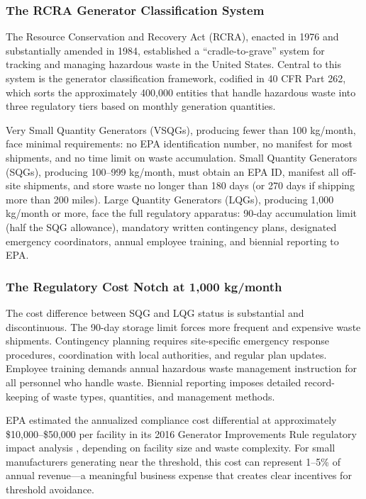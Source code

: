 \documentclass[12pt]{article}
\begin{document}
\subsubsection*{The RCRA Generator Classification System}
The Resource Conservation and Recovery Act (RCRA), enacted in 1976 and substantially amended in 1984, established a ``cradle-to-grave'' system for tracking and managing hazardous waste in the United States. Central to this system is the generator classification framework, codified in 40 CFR Part 262, which sorts the approximately 400,000 entities that handle hazardous waste into three regulatory tiers based on monthly generation quantities.

Very Small Quantity Generators (VSQGs), producing fewer than 100 kg/month, face minimal requirements: no EPA identification number, no manifest for most shipments, and no time limit on waste accumulation. Small Quantity Generators (SQGs), producing 100--999 kg/month, must obtain an EPA ID, manifest all off-site shipments, and store waste no longer than 180 days (or 270 days if shipping more than 200 miles). Large Quantity Generators (LQGs), producing 1,000 kg/month or more, face the full regulatory apparatus: 90-day accumulation limit (half the SQG allowance), mandatory written contingency plans, designated emergency coordinators, annual employee training, and biennial reporting to EPA.

\subsubsection*{The Regulatory Cost Notch at 1,000 kg/month}
The cost difference between SQG and LQG status is substantial and discontinuous. The 90-day storage limit forces more frequent and expensive waste shipments. Contingency planning requires site-specific emergency response procedures, coordination with local authorities, and regular plan updates. Employee training demands annual hazardous waste management instruction for all personnel who handle waste. Biennial reporting imposes detailed record-keeping of waste types, quantities, and management methods.

EPA estimated the annualized compliance cost differential at approximately \$10,000--\$50,000 per facility in its 2016 Generator Improvements Rule regulatory impact analysis \citep{epa2016gir}, depending on facility size and waste complexity. For small manufacturers generating near the threshold, this cost can represent 1--5\% of annual revenue---a meaningful business expense that creates clear incentives for threshold avoidance.
\end{document}
